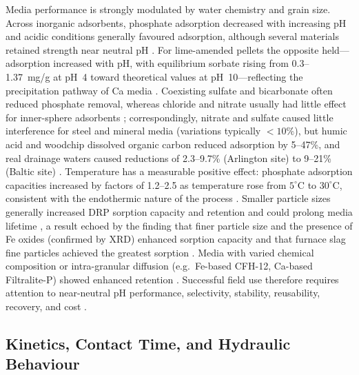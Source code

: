 \documentclass[11pt]{article}
\begin{document}
Media performance is strongly modulated by water chemistry and grain size.
Across inorganic adsorbents, phosphate adsorption decreased with increasing pH
and acidic conditions generally favoured adsorption, although several materials
retained strength near neutral pH \parencite{Li2020}. For lime-amended pellets
the opposite held---adsorption increased with pH, with equilibrium sorbate rising
from 0.3--1.37~mg/g at pH~4 toward theoretical values at pH~10---reflecting the
precipitation pathway of Ca media \parencite{Li2017}. Coexisting sulfate and
bicarbonate often reduced phosphate removal, whereas chloride and nitrate usually
had little effect for inner-sphere adsorbents \parencite{Li2020}; correspondingly,
nitrate and sulfate caused little interference for steel and mineral media
(variations typically $<10\%$), but humic acid and woodchip dissolved organic
carbon reduced adsorption by 5--47\%, and real drainage waters caused reductions
of 2.3--9.7\% (Arlington site) to 9--21\% (Baltic site) \parencite{Sellner2019b}.
Temperature has a measurable positive effect: phosphate adsorption capacities
increased by factors of 1.2--2.5 as temperature rose from $5^{\circ}$C to
$30^{\circ}$C, consistent with the endothermic nature of the process
\parencite{Sellner2019b}. Smaller particle sizes generally increased DRP sorption
capacity and retention and could prolong media lifetime \parencite{Mendes2022},
a result echoed by the finding that finer particle size and the presence of Fe
oxides (confirmed by XRD) enhanced sorption capacity \parencite{Pugliese2023}
and that furnace slag fine particles achieved the greatest sorption
\parencite{Sanford2016}. Media with varied chemical composition or intra-granular
diffusion (e.g.\ Fe-based CFH-12, Ca-based Filtralite-P) showed enhanced retention
\parencite{Mendes2022}. Successful field use therefore requires attention to
near-neutral pH performance, selectivity, stability, reusability, recovery, and
cost \parencite{Li2020}.

\subsection{Kinetics, Contact Time, and Hydraulic Behaviour}
\end{document}

